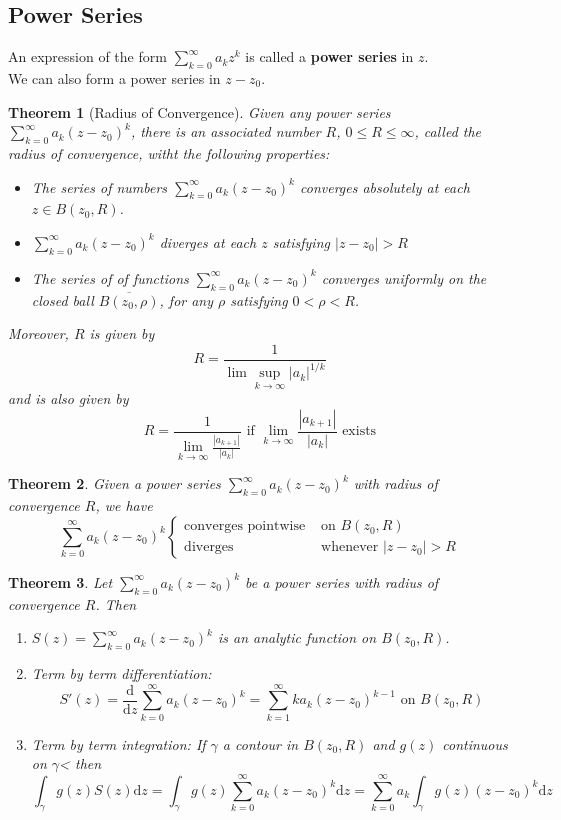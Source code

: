 \documentclass[12pt]{article}
\newcommand{\diff}{\mathrm{d}}
\newtheorem{theorem}{Theorem}[section]
\theoremstyle{definition}
\begin{document}
\subsection{Power Series}
An expression of the form $\sum_{k=0}^\infty a_kz^k$ is called a \textbf{power series} in $z$.\\
We can also form a power series in $z-z_0$.
\begin{theorem}[Radius of Convergence]
\normalfont Given any power series $\sum_{k=0}^\infty a_k(z-z_0)^k$, there is an associated number $R$, $0\leq R\leq \infty$, called the radius of convergence, witht the following properties:
\begin{itemize}
	\item The series of numbers $\sum_{k=0}^\infty a_k(z-z_0)^k$ converges absolutely at each $z\in B(z_0, R)$.
	\item $\sum_{k=0}^\infty a_k(z-z_0)^k$ diverges at each $z$ satisfying $|z-z_0|>R$
	\item The series of of functions $\sum_{k=0}^\infty a_k(z-z_0)^k$ converges uniformly on the closed ball $\overline{B(z_0, \rho)}$, for any $\rho$ satisfying $0<\rho<R$.
\end{itemize}
Moreover, $R$ is given by
\[
R=\frac{1}{\lim\sup_{k\to\infty} |a_k|^{1/k}}
\]
and is also given by
\[
R=\frac{1}{\lim_{k\to\infty}\frac{|a_{k+1}|}{|a_k|}} \text{ if }\lim_{k\to\infty} \frac{|a_{k+1}|}{|a_k|}\text{ exists}
\]
\end{theorem}
\begin{theorem}\normalfont Given a power series $\sum_{k=0}^\infty a_k(z-z_0)^k$ with radius of convergence $R$, we have
\[
\sum_{k=0}^\infty a_k(z-z_0)^k\begin{cases}
\text{converges pointwise} & \text{ on }B(z_0, R)\\
\text{diverges} & \text{ whenever }|z-z_0|>R
\end{cases}
\]
\end{theorem}
\begin{theorem}\normalfont Let $\sum_{k=0}^\infty a_k(z-z_0)^k$ be a power series with radius of convergence $R$. Then
\begin{enumerate}
	\item $S(z)=\sum_{k=0}^\infty a_k(z-z_0)^k$ is an analytic function on $B(z_0, R)$.
	\item Term by term differentiation: 
	\[
S'(z) = \frac{\diff }{\diff z}\sum_{k=0}^\infty a_k(z-z_0)^k = \sum_{k=1}^\infty k a_k (z-z_0)^{k-1}\text{ on }B(z_0, R)
\]
	\item Term by term integration: If $\gamma$ a contour in $B(z_0, R)$ and $g(z)$ continuous on $\gamma$< then
	\[
\int_\gamma g(z)S(z)\diff z = \int_\gamma g(z)\sum_{k=0}^\infty a_k(z-z_0)^k\diff z = \sum_{k=0}^\infty a_k\int_\gamma g(z)(z-z_0)^k\diff z
	\]
\end{enumerate}
\end{theorem}
\end{document}
